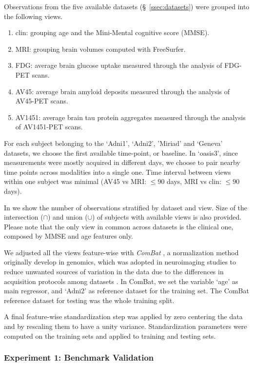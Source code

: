 Observations from the five available datasets (\S~\ref{ssec:datasets}) were grouped into the following views.
\begin{enumerate}
\item clin: grouping age and the Mini-Mental cognitive score (MMSE).
\item MRI: grouping brain volumes computed with FreeSurfer.
\item FDG: average brain glucose uptake measured through the analysis of FDG-PET scans.
\item AV45: average brain amyloid deposits measured through the analysis of AV45-PET scans.
\item AV1451: average brain tau protein aggregates measured through the analysis of AV1451-PET scans.
\end{enumerate}

For each subject belonging to the `Adni1', `Adni2', 'Miriad' and `Geneva' datasets, we choose the first available time-point, or baseline.
In `oasis3', since measurements were mostly acquired in different days, we choose to pair nearby time points across modalities into a single one.
Time interval between views within one subject was minimal (AV45 vs MRI: $\leq 90$ days, MRI vs clin: $\leq 90$ days).

In  we show the number of observations stratified by dataset and view.
Size of the intersection ($\cap$) and union ($\cup$) of subjects with available views is also provided.
Please note that the only view in common across datasets is the clinical one, composed by MMSE and age features only.

We adjusted all the views feature-wise with \textit{ComBat} \citep{combat}, a normalization method originally develop in genomics,
which was adopted in neuroimaging studies to reduce unwanted sources of variation in the data due to the differences in acquisition protocols among datasets \citep{Fortin2017, Fortin2018, Orlhac2020}.
In ComBat, we set the variable `age' as main regressor, and `Adni2' as reference dataset for the training set.
The ComBat reference dataset for testing was the whole training split.

A final feature-wise standardization step was applied by zero centering the data and by rescaling them to have a unity variance.
Standardization parameters were computed on the training sets and applied to training and testing sets.

\subsubsection{Experiment 1: Benchmark Validation}


